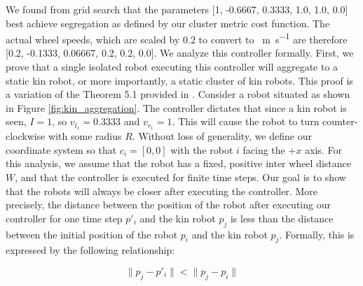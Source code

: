 \documentclass[conference]{IEEEtran}
\begin{document}
    We found from grid search that the parameters [1, -0.6667, 0.3333, 1.0, 1.0, 0.0] best achieve segregation as defined by our cluster metric cost function. The actual wheel speeds, which are scaled by $0.2$ to convert to \SI{}{\meter\per\second} are therefore [0.2, -0.1333, 0.06667, 0.2, 0.2, 0.0]. We analyze this controller formally. First, we prove that a single isolated robot executing this controller will aggregate to a static kin robot, or more importantly, a static cluster of kin robots. This proof is a variation of the Theorem 5.1 provided in \cite{gauci_self-organized_2014}. Consider a robot situated as shown in Figure \ref{fig:kin_aggregation}. The controller dictates that since a kin robot is seen, $I=1$, so $v_{l_1} = 0.3333$ and $v_{r_1} = 1$. This will cause the robot to turn counter-clockwise with some radius $R$. Without loss of generality, we define our coordinate system so that $c_i=[0,0]$ with the robot $i$ facing the $+x$ axis. For this analysis, we assume that the robot has a fixed, positive inter wheel distance $W$, and that the controller is executed for finite time steps. Our goal is to show that the robots will always be closer after executing the controller. More precisely, the distance between the position of the robot after executing our controller for one time step $p'_i$ and the kin robot $p_j$ is less than the distance between the initial position of the robot $p_i$ and the kin robot $p_j$. Formally, this is expressed by the following relationship:

    \begin{equation} \label{eq:agg}
      \lVert p_j - p'_i \rVert < \lVert p_j - p_i \rVert
    \end{equation}
\end{document}
